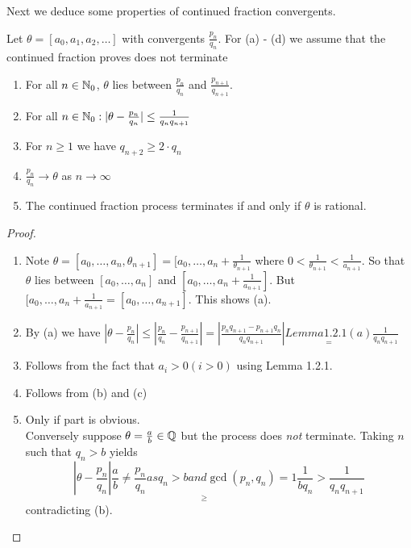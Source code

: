 \documentclass[NumTh.tex]{subfiles}
\begin{document}
Next we deduce some properties of continued fraction convergents.

\begin{theorem}\label{1_2_2}
  Let $\theta = [a_0,a_1,a_2,\dots ]$ with convergents $\frac{p_n}{q_n}$.
  For (a) - (d) we assume that the continued fraction proves does not terminate
  \begin{enumerate} %
    \item For all $n \in \mathbb{N}_0$, $\theta$ lies between $\frac{p_n}{q_n}$ and $\frac{p_{n+1}}{q_{n+1}}$.
    \item For all $n \in \mathbb{N}_0: |\theta - \frac{p_n}{q_n} | \leq \frac{1}{q_n q_{n+1}}$
    \item For $n \geq 1$ we have $q_{n+2} \geq 2\cdot q_n$
    \item $\frac{p_n}{q_n} \to \theta$ as $n \to \infty$
    \item The continued fraction process terminates if and only if $\theta$ is rational.
  \end{enumerate}
\end{theorem}

\begin{proof}
  \begin{enumerate}
    \item Note $\theta = [a_0,\dots,a_n,\theta_{n+1} ] = [a_0,\dots,a_n+\frac{1}{\theta_{n+1}}$
    where $0 < \frac{1}{\theta_{n+1}} < \frac{1}{a_{n+1}}$. So that $\theta$ lies between $[a_0,\dots,a_n]$ and $[a_0,\dots,a_n + \frac{1}{a_{n+1}} ]$.
    But $[a_0,\dots,a_n + \frac{1}{a_{n+1}} = [a_0,\dots,a_{n+1}]$. This shows (a).
    \item By (a) we have $|\theta - \frac{p_n}{q_n} | \leq |\frac{p_n}{q_n} - \frac{p_{n+1}}{q_{n+1}}| = | \frac{p_n q_{n+1} - p_{n+1} q_n}{q_n q_{n+1}} | \underset{=}{Lemma 1.2.1(a)} \frac{1}{q_n q_{n+1}}$
    \item Follows from the fact that $a_i >0 (i > 0 )$ using Lemma 1.2.1.
    \item Follows from (b) and (c)
    \item Only if part is obvious.\\
    Conversely suppose $\theta = \frac{a}{b} \in \mathbb{Q}$ but the process does \emph{not} terminate. Taking $n$ such that $q_n > b$ yields
    \[ | \theta - \frac{p_n}{q_n} | \underset{\geq}{\frac{a}{b} \neq \frac{p_n}{q_n} as q_n > b and \gcd(p_n,q_n) = 1} \frac{1}{b q_n} > \frac{1}{q_n q_{n+1}} \]
    contradicting (b).
  \end{enumerate}
\end{proof}
\end{document}
